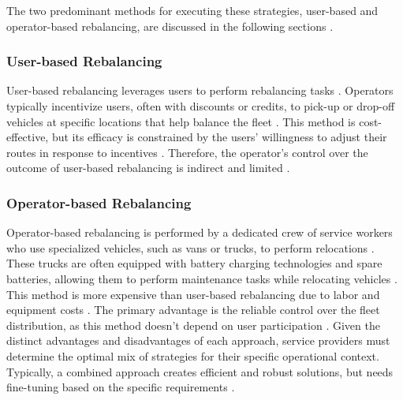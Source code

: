 The two predominant methods for executing these strategies, user-based and operator-based rebalancing, are discussed in the following sections \cite{emami_integrated_2024}.

\subsubsection{User-based Rebalancing}
User-based rebalancing leverages users to perform rebalancing tasks \cite{emami_integrated_2024}.
Operators typically incentivize users, often with discounts or credits, to pick-up or drop-off vehicles at specific locations that help balance the fleet \cite{emami_integrated_2024}.
This method is cost-effective, but its efficacy is constrained by the users' willingness to adjust their routes in response to incentives \cite{jaber_preferences_2023}.
Therefore, the operator's control over the outcome of user-based rebalancing is indirect and limited \cite{emami_integrated_2024}.

\subsubsection{Operator-based Rebalancing}
Operator-based rebalancing is performed by a dedicated crew of service workers who use specialized vehicles, such as vans or trucks, to perform relocations \cite{emami_integrated_2024}.
These trucks are often equipped with battery charging technologies and spare batteries, allowing them to perform maintenance tasks while relocating vehicles \cite{lee_battery_2024}.
This method is more expensive than user-based rebalancing due to labor and equipment costs \cite{jaber_preferences_2023}.
The primary advantage is the reliable control over the fleet distribution, as this method doesn't depend on user participation \cite{dellamico_bike_2014}.
Given the distinct advantages and disadvantages of each approach, service providers must determine the optimal mix of strategies for their specific operational context.
Typically, a combined approach creates efficient and robust solutions, but needs fine-tuning based on the specific requirements \cite{emami_integrated_2024, mahmoodian_design_2019}.

